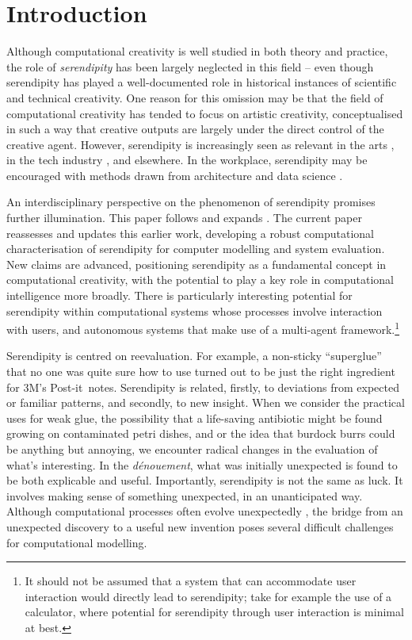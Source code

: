 \section{Introduction}

Although computational creativity is well studied in both theory and
practice, the role of \emph{serendipity} has been largely neglected
in this field -- even though serendipity has played a well-documented
role in historical instances of scientific and technical creativity.
One reason for this omission may be that the field of computational
creativity has tended to focus on artistic creativity, conceptualised in such a way that creative outputs are largely under the direct control of the creative agent.  However, serendipity is increasingly seen as relevant in the arts
\cite{mckay-serendipity}, in the tech industry \cite{rao2015breaking}, and elsewhere.  In the workplace,
serendipity may be encouraged with methods drawn from architecture and data science \cite{kakko2009homo,engineering-serendipity}. 

An interdisciplinary perspective on the phenomenon of serendipity
promises further illumination.   
  This paper follows and expands .  The current paper reassesses and updates this earlier work, developing a robust computational characterisation of serendipity for computer modelling and system evaluation.  New claims are advanced, positioning serendipity as a fundamental concept in computational creativity, with the potential to play a key role in computational intelligence more broadly.  There is particularly interesting potential for serendipity within computational systems whose processes involve interaction with users, and autonomous systems that make use of a multi-agent framework.\footnote{It should not be assumed that a system that can accommodate user interaction would directly lead to serendipity; take for example the use of a calculator, where potential for serendipity through user interaction is minimal at best.}

Serendipity is centred on reevaluation.  For example, a
non-sticky ``superglue'' that no one was quite sure how to use turned
out to be just the right ingredient for 3M's
Post-it\texttrademark\ notes.
%
Serendipity is related, firstly, to deviations from expected or
familiar patterns, and secondly, to new insight.
%
When we consider the practical uses for weak glue, the possibility
that a life-saving antibiotic might be found growing on contaminated
petri dishes, and or the idea that burdock burrs could be anything but
annoying, we encounter radical changes in the evaluation of what's
interesting.  In the \emph{d\'enouement}, what was initially
unexpected is found to be both explicable and useful.  Importantly,
serendipity is not the same as luck.  It involves making sense of
something unexpected, in an unanticipated way.  Although computational
processes often evolve unexpectedly
\cite{minsky1967programming}, the bridge from an unexpected discovery
to a useful new invention poses several difficult challenges for
computational modelling.

